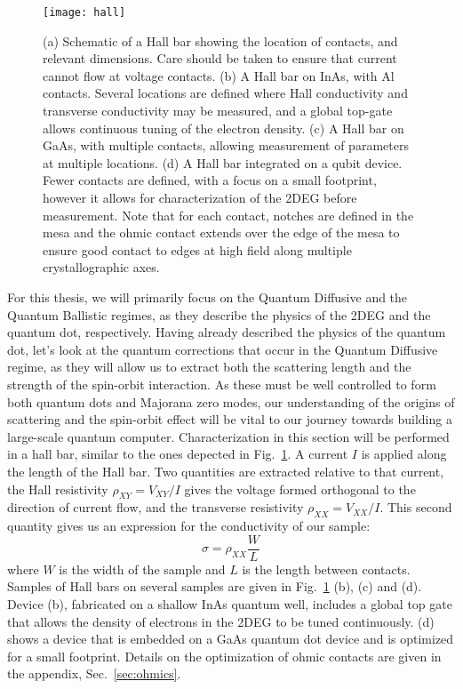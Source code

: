 \begin{figure}
  \texttt{[image: hall]}
  \caption[Schematic of a Hall bar and several devices]
  {\label{fig:hall}(a) Schematic of a Hall bar showing the location of contacts, and relevant dimensions. Care should be taken to ensure that current cannot flow at voltage contacts. (b) A Hall bar on InAs, with Al contacts. Several locations are defined where Hall conductivity and transverse conductivity may be measured, and a global top-gate allows continuous tuning of the electron density. (c) A Hall bar on GaAs, with multiple contacts, allowing measurement of parameters at multiple locations. (d) A Hall bar integrated on a qubit device. Fewer contacts are defined, with a focus on a small footprint, however it allows for characterization of the 2DEG before measurement. Note that for each contact, notches are defined in the mesa and the ohmic contact extends over the edge of the mesa to ensure good contact to edges at high field along multiple crystallographic axes.}
\end{figure}

For this thesis, we will primarily focus on the Quantum Diffusive and the Quantum Ballistic regimes, as they describe the physics of the
2DEG and the quantum dot, respectively. Having already described the physics of the quantum dot, let's look at the quantum corrections that occur
in the Quantum Diffusive regime, as they will allow us to extract both the scattering length and the strength of the spin-orbit interaction.
As these must be well controlled to form both quantum dots and Majorana zero modes, our understanding of the origins of
scattering and the spin-orbit effect will be vital to our journey towards building a large-scale quantum computer. Characterization in this section
will be performed in a hall bar, similar to the ones depected in Fig.~\ref{fig:hall}. A current $I$ is applied along the length of the Hall bar.
Two quantities are extracted relative to that current, the Hall resistivity $\rho_{XY} = V_{XY}/I$ gives
the voltage formed orthogonal to the direction of current flow, and the transverse resistivity $\rho_{XX} = V_{XX}/I$.
This second quantity gives us an expression for the conductivity of our sample:
\begin{equation}
  \sigma = \rho_{XX} \frac{W}{L}
\end{equation}
where $W$ is the width of the sample and $L$ is the length between contacts. Samples of Hall bars on several samples are given in Fig.~\ref{fig:hall} (b),
(c) and (d). Device (b), fabricated on a shallow InAs quantum well, includes a global top gate that allows the density of electrons in the 2DEG to be tuned continuously.
(d) shows a device that is embedded on a GaAs quantum dot device and is optimized for a small footprint. Details on the optimization of ohmic contacts
are given in the appendix, Sec.~\ref{sec:ohmics}.


